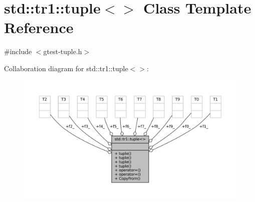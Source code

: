 \hypertarget{classstd_1_1tr1_1_1tuple}{}\section{std\+:\+:tr1\+:\+:tuple$<$$>$ Class Template Reference}
\label{classstd_1_1tr1_1_1tuple}


{\ttfamily \#include $<$gtest-\/tuple.\+h$>$}



Collaboration diagram for std\+:\+:tr1\+:\+:tuple$<$$>$\+:
\nopagebreak
\begin{figure}[H]
\begin{center}
\leavevmode
\includegraphics[width=350pt]{classstd_1_1tr1_1_1tuple__coll__graph}
\end{center}
\end{figure}
